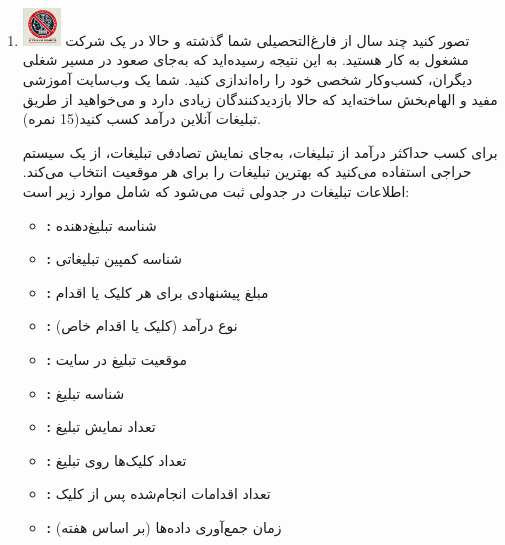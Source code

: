 \documentclass[12pt]{article}
\begin{document}
\begin{enumerate}
    \item \includegraphics[width=1cm]{figs/Forbidden_AI.jpg}
    تصور کنید چند سال از فارغ‌التحصیلی شما گذشته و حالا در یک شرکت مشغول به کار هستید. به این نتیجه رسیده‌اید که به‌جای صعود در مسیر شغلی دیگران، کسب‌وکار شخصی خود را راه‌اندازی کنید. شما یک وب‌سایت آموزشی مفید و الهام‌بخش ساخته‌اید که حالا بازدیدکنندگان زیادی دارد و می‌خواهید از طریق تبلیغات آنلاین درآمد کسب کنید(15 نمره).

    برای کسب حداکثر درآمد از تبلیغات، به‌جای نمایش تصادفی تبلیغات، از یک سیستم حراجی استفاده می‌کنید که بهترین تبلیغات را برای هر موقعیت انتخاب می‌کند. اطلاعات تبلیغات در جدولی ثبت می‌شود که شامل موارد زیر است:
    
    \begin{itemize}
        \item \textbf{:} شناسه تبلیغ‌دهنده
        \item \textbf{:} شناسه کمپین تبلیغاتی
        \item \textbf{:} مبلغ پیشنهادی برای هر کلیک یا اقدام
        \item \textbf{:} نوع درآمد (کلیک یا اقدام خاص)
        \item \textbf{:} موقعیت تبلیغ در سایت
        \item \textbf{:} شناسه تبلیغ
        \item \textbf{:} تعداد نمایش تبلیغ
        \item \textbf{:} تعداد کلیک‌ها روی تبلیغ
        \item \textbf{:} تعداد اقدامات انجام‌شده پس از کلیک
        \item \textbf{:} زمان جمع‌آوری داده‌ها (بر اساس هفته)
    \end{itemize}
    

\end{enumerate}
\end{document}
